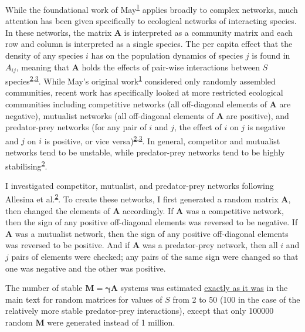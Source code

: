 \documentclass[]{article}
\begin{document}
While the foundational work of
May\textsuperscript{\protect\hyperlink{ref-May1972}{1}} applies broadly
to complex networks, much attention has been given specifically to
ecological networks of interacting species. In these networks, the
matrix \(\mathbf{A}\) is interpreted as a community matrix and each row
and column is interpreted as a single species. The per capita effect
that the density of any species \(i\) has on the population dynamics of
species \(j\) is found in \(A_{ij}\), meaning that \(\mathbf{A}\) holds
the effects of pair-wise interactions between \(S\)
species\textsuperscript{\protect\hyperlink{ref-Allesina2012}{2},\protect\hyperlink{ref-Allesina2015}{3}}.
While May's original
work\textsuperscript{\protect\hyperlink{ref-May1972}{1}} considered only
randomly assembled communities, recent work has specifically looked at
more restricted ecological communities including competitive networks
(all off-diagonal elements of \(\mathbf{A}\) are negative), mutualist
networks (all off-diagonal elements of \(\mathbf{A}\) are positive), and
predator-prey networks (for any pair of \(i\) and \(j\), the effect of
\(i\) on \(j\) is negative and \(j\) on \(i\) is positive, or vice
versa)\textsuperscript{\protect\hyperlink{ref-Allesina2012}{2},\protect\hyperlink{ref-Allesina2015}{3}}.
In general, competitor and mutualist networks tend to be unstable, while
predator-prey networks tend to be highly
stabilising\textsuperscript{\protect\hyperlink{ref-Allesina2012}{2}}.

I investigated competitor, mutualist, and predator-prey networks
following Allesina et
al.\textsuperscript{\protect\hyperlink{ref-Allesina2012}{2}}. To create
these networks, I first generated a random matrix \(\mathbf{A}\), then
changed the elements of \(\mathbf{A}\) accordingly. If \(\mathbf{A}\)
was a competitive network, then the sign of any positive off-diagonal
elements was reversed to be negative. If \(\mathbf{A}\) was a mutualist
network, then the sign of any positive off-diagonal elements was
reversed to be positive. And if \(\mathbf{A}\) was a predator-prey
network, then all \(i\) and \(j\) pairs of elements were checked; any
pairs of the same sign were changed so that one was negative and the
other was positive.

The number of stable \(\mathbf{M = \gamma A}\) systems was estimated
\protect\hyperlink{IncrS}{exactly as it was} in the main text for random
matrices for values of \(S\) from 2 to 50 (100 in the case of the
relatively more stable predator-prey interactions), except that only
100000 random \(\mathbf{M}\) were generated instead of 1 million.
\end{document}
